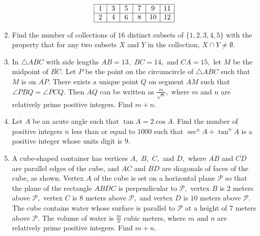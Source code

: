 \documentclass{article}
\begin{document}
\begin{enumerate}[label=\arabic*., itemsep=0.5em]
\begin{equation*}
\begin{array}{|c|c|c|c|c|c|} \hline
\,1\, & \,3\, & \,5\, & \,7\, & \,9\, & 11 \\ \hline
\,2\, & \,4\, & \,6\, & \,8\, & 10 & 12 \\ \hline
\end{array}
\end{equation*}
\par \vspace{0.5em}\item Find the number of collections of $16$ distinct subsets of $\{1,2,3,4,5\}$ with the property that for any two subsets $X$ and $Y$ in the collection, $X \cap Y \not= \emptyset.$\par \vspace{0.5em}\item In $\triangle ABC$ with side lengths $AB = 13,$ $BC = 14,$ and $CA = 15,$ let $M$ be the midpoint of $\overline{BC}.$ Let $P$ be the point on the circumcircle of $\triangle ABC$ such that $M$ is on $\overline{AP}.$ There exists a unique point $Q$ on segment $\overline{AM}$ such that $\angle PBQ = \angle PCQ.$ Then $AQ$ can be written as $\frac{m}{\sqrt{n}},$ where $m$ and $n$ are relatively prime positive integers. Find $m+n.$\par \vspace{0.5em}\item Let $A$ be an acute angle such that $\tan A = 2 \cos A.$ Find the number of positive integers $n$ less than or equal to $1000$ such that $\sec^n A + \tan^n A$ is a positive integer whose units digit is $9.$\par \vspace{0.5em}\item A cube-shaped container has vertices $A,$ $B,$ $C,$ and $D,$ where $\overline{AB}$ and $\overline{CD}$ are parallel edges of the cube, and $\overline{AC}$ and $\overline{BD}$ are diagonals of faces of the cube, as shown. Vertex $A$ of the cube is set on a horizontal plane $\mathcal{P}$ so that the plane of the rectangle $ABDC$ is perpendicular to $\mathcal{P},$ vertex $B$ is $2$ meters above $\mathcal{P},$ vertex $C$ is $8$ meters above $\mathcal{P},$ and vertex $D$ is $10$ meters above $\mathcal{P}.$ The cube contains water whose surface is parallel to $\mathcal{P}$ at a height of $7$ meters above $\mathcal{P}.$ The volume of water is $\frac{m}{n}$ cubic meters, where $m$ and $n$ are relatively prime positive integers. Find $m+n.$


\end{enumerate}
\end{document}
